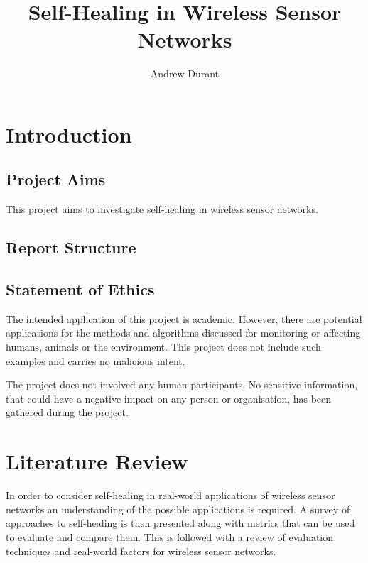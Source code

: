 \documentclass[authoryearcitations]{UoYCSproject}
\author{Andrew Durant}
\title{Self-Healing in Wireless Sensor Networks}
\begin{document}
\maketitle
\listoffigures
\listoftables
\renewcommand*{\lstlistlistingname}{List of Listings}
\lstlistoflistings

\chapter{Introduction}
\label{cha:Introduction}

\section{Project Aims}

This project aims to investigate self-healing in wireless sensor networks.

\section{Report Structure}

\section{Statement of Ethics}

The intended application of this project is academic. However, there are potential applications for the methods and algorithms discussed for monitoring or affecting humans, animals or the environment. This project does not include such examples and carries no malicious intent.

The project does not involved any human participants. No sensitive information, that could have a negative impact on any person or organisation, has been gathered during the project.

\chapter{Literature Review}
\label{cha:LitReview}


In order to consider self-healing in real-world applications of wireless sensor networks an understanding of the possible applications is required. A survey of approaches to self-healing is then presented along with metrics that can be used to evaluate and compare them. This is followed with a review of evaluation techniques and real-world factors for wireless sensor networks.
\end{document}
